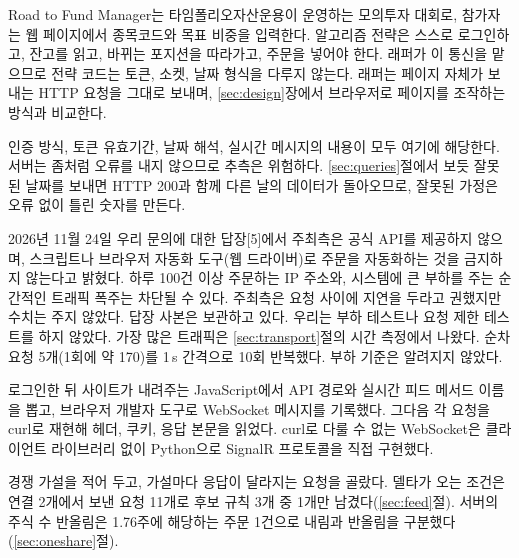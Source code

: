 \seclabel
{}

 Road to Fund Manager는 타임폴리오자산운용이 운영하는 모의투자 대회로, 참가자는 웹 페이지에서 종목코드와 목표 비중을 입력한다. 알고리즘 전략은 스스로 로그인하고, 잔고를 읽고, 바뀌는 포지션을 따라가고, 주문을 넣어야 한다. 래퍼가 이 통신을 맡으므로 전략 코드는 토큰, 소켓, 날짜 형식을 다루지 않는다. 래퍼는 페이지 자체가 보내는 HTTP 요청을 그대로 보내며, \ref{sec:design}장에서 브라우저로 페이지를 조작하는 방식과 비교한다.

 인증 방식, 토큰 유효기간, 날짜 해석, 실시간 메시지의 내용이 모두 여기에 해당한다. 서버는 좀처럼 오류를 내지 않으므로 추측은 위험하다. \ref{sec:queries}절에서 보듯 잘못된 날짜를 보내면 HTTP 200과 함께 다른 날의 데이터가 돌아오므로, 잘못된 가정은 오류 없이 틀린 숫자를 만든다.

 2026년 11월 24일 우리 문의에 대한 답장[5]에서 주최측은 공식 API를 제공하지 않으며, 스크립트나 브라우저 자동화 도구(웹 드라이버)로 주문을 자동화하는 것을 금지하지 않는다고 밝혔다. 하루 100건 이상 주문하는 IP 주소와, 시스템에 큰 부하를 주는 순간적인 트래픽 폭주는 차단될 수 있다. 주최측은 요청 사이에 지연을 두라고 권했지만 수치는 주지 않았다. 답장 사본은 보관하고 있다. 우리는 부하 테스트나 요청 제한 테스트를 하지 않았다. 가장 많은 트래픽은 \ref{sec:transport}절의 시간 측정에서 나왔다. 순차 요청 5개(1회에 약 170\ms)를 1\,s 간격으로 10회 반복했다. 부하 기준은 알려지지 않았다.

 로그인한 뒤 사이트가 내려주는 JavaScript에서 API 경로와 실시간 피드 메서드 이름을 뽑고, 브라우저 개발자 도구로 WebSocket 메시지를 기록했다. 그다음 각 요청을 curl로 재현해 헤더, 쿠키, 응답 본문을 읽었다. curl로 다룰 수 없는 WebSocket은 클라이언트 라이브러리 없이 Python으로 SignalR 프로토콜을 직접 구현했다.

 경쟁 가설을 적어 두고, 가설마다 응답이 달라지는 요청을 골랐다. 델타가 오는 조건은 연결 2개에서 보낸 요청 11개로 후보 규칙 3개 중 1개만 남겼다(\ref{sec:feed}절). 서버의 주식 수 반올림은 1.76주에 해당하는 주문 1건으로 내림과 반올림을 구분했다(\ref{sec:oneshare}절).

